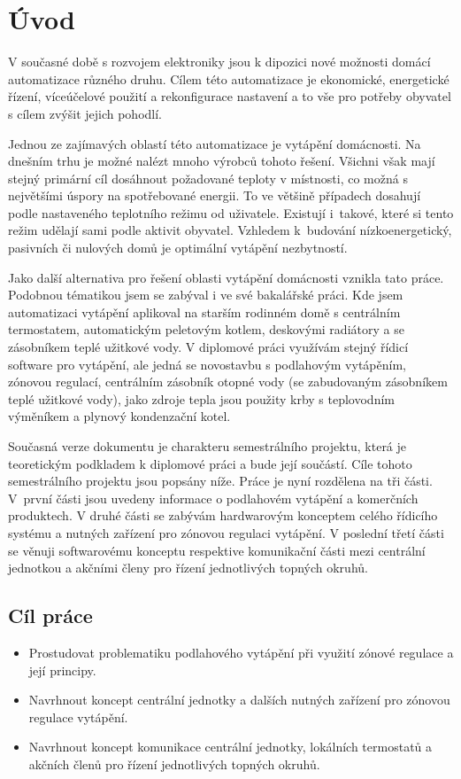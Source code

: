 \chapter{Úvod}

V současné době s rozvojem elektroniky jsou k dipozici nové možnosti domácí automatizace různého druhu. Cílem této automatizace je ekonomické, energetické řízení, víceúčelové použití a rekonfigurace nastavení a to vše pro potřeby obyvatel s cílem zvýšit jejich pohodlí.


Jednou ze zajímavých oblastí této automatizace je vytápění domácnosti. Na dnešním trhu je možné nalézt mnoho výrobců tohoto řešení. Všichni však mají stejný primární cíl dosáhnout požadované teploty v místnosti, co možná s největšími úspory na spotřebované energii. To ve většině případech dosahují podle nastaveného teplotního režimu od uživatele. Existují i~takové, které si tento režim udělají sami podle aktivit obyvatel. Vzhledem k~budování nízkoenergetický, pasivních či nulových domů je optimální vytápění nezbytností.

Jako další alternativa pro řešení oblasti vytápění domácnosti vznikla tato práce. Podobnou tématikou jsem se zabýval i ve své bakalářské práci. Kde jsem automatizaci vytápění aplikoval na starším rodinném domě s centrálním termostatem, automatickým peletovým kotlem, deskovými radiátory a se zásobníkem teplé užitkové vody. V diplomové práci využívám stejný řídicí software pro vytápění, ale jedná se novostavbu s podlahovým vytápěním, zónovou regulací, centrálním zásobník otopné vody (se zabudovaným zásobníkem teplé užitkové vody), jako zdroje tepla jsou použity krby s teplovodním výměníkem a plynový kondenzační kotel.

Současná verze dokumentu je charakteru semestrálního projektu, která je teoretickým podkladem k diplomové práci a bude její součástí. Cíle tohoto semestrálního projektu jsou popsány níže. Práce je nyní rozdělena na tři části. V~první části jsou uvedeny informace o podlahovém vytápění a komerčních produktech. V druhé části se zabývám hardwarovým konceptem celého řídicího systému a nutných zařízení pro zónovou regulaci vytápění. V poslední třetí části se věnuji softwarovému konceptu respektive komunikační části mezi centrální jednotkou a akčními členy pro řízení jednotlivých topných okruhů.

\section{Cíl práce}
\begin{itemize}
\item Prostudovat problematiku podlahového vytápění při využití zónové regulace a její principy.
\item Navrhnout koncept centrální jednotky a dalších nutných zařízení pro zónovou regulace vytápění.
\item Navrhnout koncept komunikace centrální jednotky, lokálních termostatů a akčních členů pro řízení jednotlivých topných okruhů.
\end{itemize}